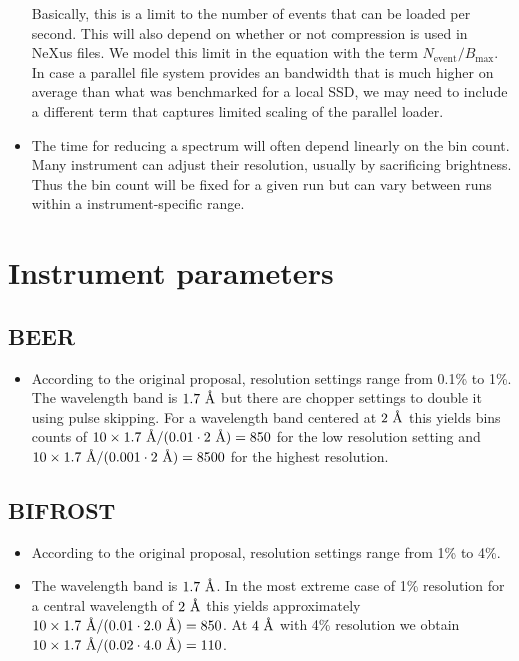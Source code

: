 \documentclass[a4paper,english,numbers=noenddot,bibliography=totoc,chapterprefix=on,DIV=12]{scrartcl}
\newcommand{\angstrom}{\textup{\AA}}
\newcommand{\Nevent}{N_{\text{event}}}
\newcommand{\Bmax}{B_{\text{max}}}
\newcommand{\beer}{BEER\xspace}
\newcommand{\bifrost}{BIFROST\xspace}
\begin{document}
\begin{itemize}
  Basically, this is a limit to the number of events that can be loaded per second.
  This will also depend on whether or not compression is used in NeXus files.
  We model this limit in the equation with the term $\Nevent/\Bmax$.
  In case a parallel file system provides an bandwidth that is much higher on average than what was benchmarked for a local SSD, we may need to include a different term that captures limited scaling of the parallel loader.
\item The time for reducing a spectrum will often depend linearly on the bin count.
  Many instrument can adjust their resolution, usually by sacrificing brightness.
  Thus the bin count will be fixed for a given run but can vary between runs within a instrument-specific range.
\end{itemize}




\section{Instrument parameters}
\label{app:instrument-parameters}


\subsection{\beer}

\begin{itemize}
  \item According to the original proposal, resolution settings range from 0.1\% to 1\%.
    The wavelength band is $1.7~\angstrom$ but there are chopper settings to double it using pulse skipping.
    For a wavelength band centered at $2~\angstrom$ this yields bins counts of $10\times1.7~\angstrom/(0.01\cdot2~\angstrom) = 850$ for the low resolution setting and $10\times1.7~\angstrom/(0.001\cdot2~\angstrom) = 8500$ for the highest resolution.
\end{itemize}


\subsection{\bifrost}

\begin{itemize}
  \item According to the original proposal, resolution settings range from 1\% to 4\%.
  \item The wavelength band is $1.7~\angstrom$.
    In the most extreme case of 1\% resolution for a central wavelength of $2~\angstrom$ this yields approximately $10\times1.7~\angstrom/(0.01\cdot2.0~\angstrom) = 850$.
    At $4~\angstrom$ with 4\% resolution we obtain $10\times1.7~\angstrom/(0.02\cdot4.0~\angstrom) = 110$.
\end{itemize}
\end{document}
